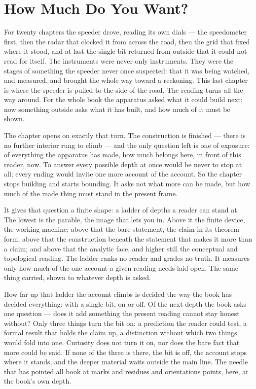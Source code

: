 \chapter{How Much Do You Want?}

For twenty chapters the speeder drove, reading its own dials --- the speedometer first, then the radar that clocked it from across the road, then the grid that fixed where it stood, and at last the single bit returned from outside that it could not read for itself. The instruments were never only instruments. They were the stages of something the speeder never once suspected: that it was being watched, and measured, and brought the whole way toward a reckoning. This last chapter is where the speeder is pulled to the side of the road. The reading turns all the way around. For the whole book the apparatus asked what it could build next; now something outside asks what it has built, and how much of it must be shown.

The chapter opens on exactly that turn. The construction is finished --- there is no further interior rung to climb --- and the only question left is one of exposure: of everything the apparatus has made, how much belongs here, in front of this reader, now. To answer every possible depth at once would be never to stop at all; every ending would invite one more account of the account. So the chapter stops building and starts bounding. It asks not what more can be made, but how much of the made thing must stand in the present frame.

It gives that question a finite shape: a ladder of depths a reader can stand at. The lowest is the parable, the image that lets you in. Above it the finite device, the working machine; above that the bare statement, the claim in its theorem form; above that the construction beneath the statement that makes it more than a claim; and above that the analytic face, and higher still the conceptual and topological reading. The ladder ranks no reader and grades no truth. It measures only how much of the one account a given reading needs laid open. The same thing carried, shown to whatever depth is asked.

How far up that ladder the account climbs is decided the way the book has decided everything: with a single bit, on or off. Of the next depth the book asks one question --- does it add something the present reading cannot stay honest without? Only three things turn the bit on: a prediction the reader could test, a formal result that holds the claim up, a distinction without which two things would fold into one. Curiosity does not turn it on, nor does the bare fact that more could be said. If none of the three is there, the bit is off, the account stops where it stands, and the deeper material waits outside the main line. The needle that has pointed all book at marks and residues and orientations points, here, at the book's own depth.

